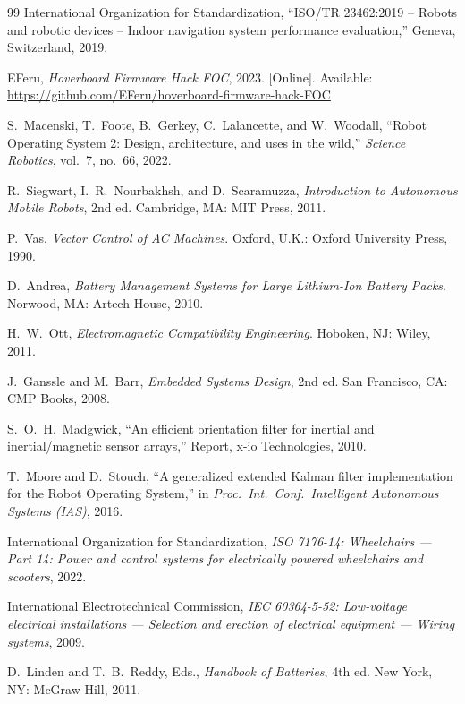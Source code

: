 \documentclass[12pt,a4paper]{report}
\begin{document}
\begin{singlespace}
\begin{thebibliography}{99}
International Organization for Standardization, ``ISO/TR 23462:2019 -- Robots and robotic devices -- Indoor navigation system performance evaluation,'' Geneva, Switzerland, 2019.



EFeru, \textit{Hoverboard Firmware Hack FOC}, 2023. [Online]. Available:
\url{https://github.com/EFeru/hoverboard-firmware-hack-FOC}

S.~Macenski, T.~Foote, B.~Gerkey, C.~Lalancette, and W.~Woodall,
``Robot Operating System 2: Design, architecture, and uses in the wild,''
\textit{Science Robotics}, vol.~7, no.~66, 2022.

R.~Siegwart, I.~R.~Nourbakhsh, and D.~Scaramuzza,
\textit{Introduction to Autonomous Mobile Robots}, 2nd ed.
Cambridge, MA: MIT Press, 2011.

P.~Vas,
\textit{Vector Control of AC Machines}.
Oxford, U.K.: Oxford University Press, 1990.

D.~Andrea,
\textit{Battery Management Systems for Large Lithium-Ion Battery Packs}.
Norwood, MA: Artech House, 2010.

H.~W.~Ott,
\textit{Electromagnetic Compatibility Engineering}.
Hoboken, NJ: Wiley, 2011.

J.~Ganssle and M.~Barr,
\textit{Embedded Systems Design}, 2nd ed.
San Francisco, CA: CMP Books, 2008.

S.~O.~H.~Madgwick,
``An efficient orientation filter for inertial and inertial/magnetic sensor arrays,''
Report, x-io Technologies, 2010.

T.~Moore and D.~Stouch,
``A generalized extended Kalman filter implementation for the Robot Operating System,''
in \textit{Proc.\ Int.\ Conf.\ Intelligent Autonomous Systems (IAS)}, 2016.

International Organization for Standardization,
\textit{ISO 7176-14: Wheelchairs — Part 14: Power and control systems for
electrically powered wheelchairs and scooters}, 2022.

International Electrotechnical Commission,
\textit{IEC 60364-5-52: Low-voltage electrical installations — Selection and
erection of electrical equipment — Wiring systems}, 2009.

D.~Linden and T.~B.~Reddy, Eds.,
\textit{Handbook of Batteries}, 4th ed.
New York, NY: McGraw-Hill, 2011.


\end{thebibliography}
\end{singlespace}
\end{document}

